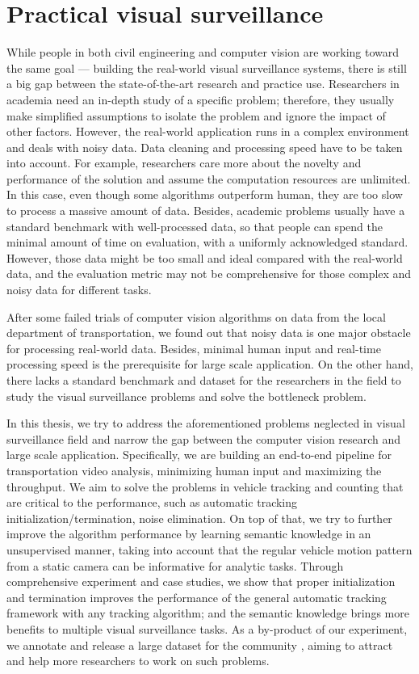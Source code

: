 \section{Practical visual surveillance}
\label{sec:intro-surveillance-cv}

While people in both civil engineering and computer vision are working toward the same goal --- building the real-world visual surveillance systems, there is still a big gap between the state-of-the-art research and practice use.
Researchers in academia need an in-depth study of a specific problem; therefore, they usually make simplified assumptions to isolate the problem and ignore the impact of other factors. 
However, the real-world application runs in a complex environment and deals with noisy data. Data cleaning and processing speed have to be taken into account.
For example, researchers care more about the novelty and performance of the solution and assume the computation resources are unlimited. 
In this case, even though some algorithms outperform human, they are too slow to process a massive amount of data. 
Besides, academic problems usually have a standard benchmark with well-processed data, so that people can spend the minimal amount of time on evaluation, with a uniformly acknowledged standard.
However, those data might be too small and ideal compared with the real-world data, and the evaluation metric may not be comprehensive for those complex and noisy data for different tasks.

After some failed trials of computer vision algorithms on data from the local department of transportation, we found out that noisy data is one major obstacle for processing real-world data. 
Besides, minimal human input and real-time processing speed is the prerequisite for large scale application.
On the other hand, there lacks a standard benchmark and dataset for the researchers in the field to study the visual surveillance problems and solve the bottleneck problem.

In this thesis, we try to address the aforementioned problems neglected in visual surveillance field and narrow the gap between the computer vision research and large scale application. 
Specifically, we are building an end-to-end pipeline for transportation video analysis, minimizing human input and maximizing the throughput.
We aim to solve the problems in vehicle tracking and counting that are critical to the performance, such as automatic tracking initialization/termination, noise elimination.
On top of that, we try to further improve the algorithm performance by learning semantic knowledge in an unsupervised manner, taking into account that the regular vehicle motion pattern from a static camera  can be informative for analytic tasks.
Through comprehensive experiment and case studies, we show that proper initialization and termination improves the performance of the general automatic tracking framework with any tracking algorithm; and the semantic knowledge brings more benefits to multiple visual surveillance tasks.
As a by-product of our experiment, we annotate and release a large dataset for the community \cite{yanziVehicleTracker}, aiming to attract and help more researchers to work on such problems.